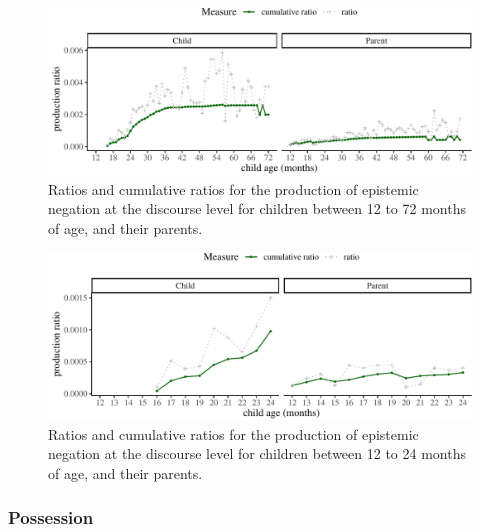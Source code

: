 \documentclass[
  english,
  man,floatsintext]{apa6}
\begin{document}
\begin{figure}[H]

{\centering \includegraphics{neg_construction_article_files/figure-latex/epistemicdiscourse-1} 

}

\caption{Ratios and cumulative ratios for the production of epistemic negation at the discourse level for children between 12 to 72 months of age, and their parents.}\label{fig:epistemicdiscourse}
\end{figure}

\begin{figure}[H]

{\centering \includegraphics{neg_construction_article_files/figure-latex/epistemicdiscoursebegin-1} 

}

\caption{Ratios and cumulative ratios for the production of epistemic negation at the discourse level for children between 12 to 24 months of age, and their parents.}\label{fig:epistemicdiscoursebegin}
\end{figure}

\hypertarget{possession}{%
\subsubsection{Possession}\label{possession}}
\end{document}
